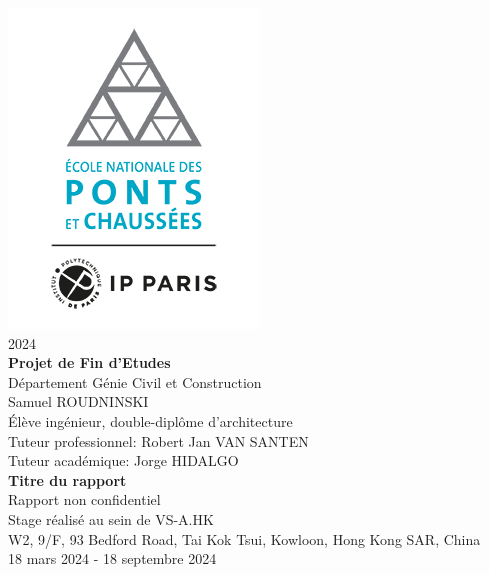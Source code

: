 \documentclass[11pt,titlepage]{article}
\begin{document}
\renewcommand{\headrulewidth}{0pt}

\pagestyle{fancy}
\fancyhead{} %
\fancyfoot{} %
\fancyfoot[R]{\thepage}

\begin{titlepage}
\center
\includegraphics[scale=0.5]{img/logo/logo_enpc.png}
\\[0.25cm]
{\large 2024}
\\[0.75cm]
{\LARGE \bfseries Projet de Fin d'Etudes}
\\[1cm]
{\Large Département Génie Civil et Construction}
\\[1cm]
{\Large Samuel ROUDNINSKI}
\\[0.5cm]
{\Large Élève ingénieur, double-diplôme d'architecture}
\\[1cm]
{\Large Tuteur professionnel: Robert Jan VAN SANTEN}
\\[1cm]
{\Large Tuteur académique: Jorge HIDALGO}
\\[1cm]
{\huge \bfseries Titre du rapport}
\\[1cm]
{\Large Rapport non confidentiel}
\\[1.5cm]
{ Stage réalisé au sein de VS-A.HK}
\\[0.25cm]
{W2, 9/F, 93 Bedford Road, Tai Kok Tsui, Kowloon, Hong Kong SAR, China}
\\[0.25cm]
{ 18 mars 2024 - 18 septembre 2024}
\end{titlepage}

\def\abstract{
   \vfil
\begin{center}%
{\bfseries \abstractname\vspace{-.5em}}%
\end{center}
\quotation
}
\end{document}

